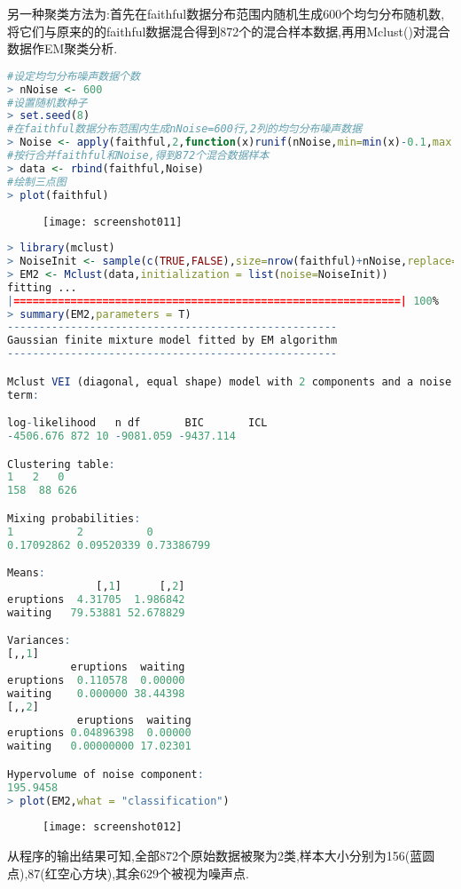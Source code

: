 \documentclass[11pt,a4paper,oneside]{book}
\begin{document}
另一种聚类方法为:首先在faithful数据分布范围内随机生成600个均匀分布随机数,将它们与原来的的faithful数据混合得到872个的混合样本数据,再用Mclust()对混合数据作EM聚类分析.
\begin{lstlisting}[language=r]
#设定均匀分布噪声数据个数
> nNoise <- 600  
#设置随机数种子
> set.seed(8)
#在faithful数据分布范围内生成nNoise=600行,2列的均匀分布噪声数据
> Noise <- apply(faithful,2,function(x)runif(nNoise,min=min(x)-0.1,max = max(x)+0.1))
#按行合并faithful和Noise,得到872个混合数据样本
> data <- rbind(faithful,Noise)
#绘制三点图
> plot(faithful)
\end{lstlisting}
\begin{figure}[H]
	\centering
	\texttt{[image: screenshot011]}
\end{figure}

\begin{lstlisting}[language=r]
> library(mclust)
> NoiseInit <- sample(c(TRUE,FALSE),size=nrow(faithful)+nNoise,replace=TRUE,prob = c(3,1)/4)
> EM2 <- Mclust(data,initialization = list(noise=NoiseInit))
fitting ...
|=============================================================| 100%
> summary(EM2,parameters = T)
---------------------------------------------------- 
Gaussian finite mixture model fitted by EM algorithm 
---------------------------------------------------- 

Mclust VEI (diagonal, equal shape) model with 2 components and a noise
term: 

log-likelihood   n df       BIC       ICL
-4506.676 872 10 -9081.059 -9437.114

Clustering table:
1   2   0 
158  88 626 

Mixing probabilities:
1          2          0 
0.17092862 0.09520339 0.73386799 

Means:
              [,1]      [,2]
eruptions  4.31705  1.986842
waiting   79.53881 52.678829

Variances:
[,,1]
          eruptions  waiting
eruptions  0.110578  0.00000
waiting    0.000000 38.44398
[,,2]
           eruptions  waiting
eruptions 0.04896398  0.00000
waiting   0.00000000 17.02301

Hypervolume of noise component:
195.9458 
> plot(EM2,what = "classification")
\end{lstlisting}
\begin{figure}[H]
	\centering
	\texttt{[image: screenshot012]}
\end{figure}
从程序的输出结果可知,全部872个原始数据被聚为2类,样本大小分别为156(蓝圆点),87(红空心方块),其余629个被视为噪声点.
\end{document}
